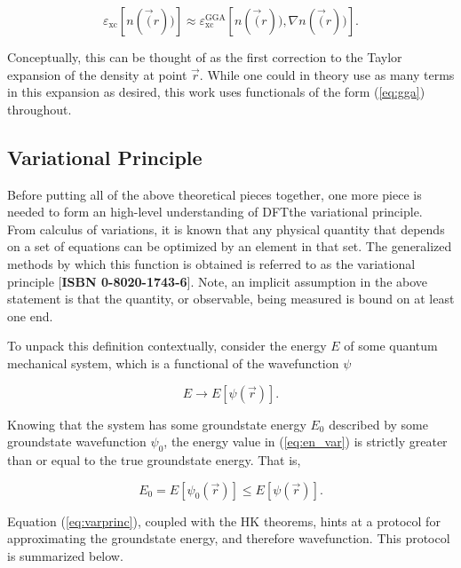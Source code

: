     \begin{equation}
    \label{eq:gga}
        \varepsilon_\text{xc}[n(\vec(r))] \approx \varepsilon_\text{xc}^\text{GGA}[n(\vec(r)),\nabla n(\vec(r))].
    \end{equation}
    
    \noindent Conceptually, this can be thought of as the first correction to the Taylor expansion of the density at point $\vec{r}$. While one could in theory use as many terms in this expansion as desired, this work uses functionals of the form (\ref{eq:gga}) throughout.
    
    \subsection{Variational Principle}
    
    Before putting all of the above theoretical pieces together, one more piece is needed to form an high-level understanding of DFT\textemdash the variational principle. From calculus of variations, it is known that any physical quantity that depends on a set of equations can be optimized by an element in that set. The generalized methods by which this function is obtained is referred to as the variational principle [\textbf{ISBN 0-8020-1743-6}]. Note, an implicit assumption in the above statement is that the quantity, or observable, being measured is bound on at least one end.
    
    To unpack this definition contextually, consider the energy $E$ of some quantum mechanical system, which is a functional of the wavefunction $\psi$
    
    \begin{equation}
    \label{eq:en_var}
        E \rightarrow E[\psi(\vec{r})].
    \end{equation}
    
    \noindent Knowing that the system has some groundstate energy $E_0$ described by some groundstate wavefunction $\psi_0$, the energy value in (\ref{eq:en_var}) is strictly greater than or equal to the true groundstate energy. That is,
    
    \begin{equation}
        \label{eq:varprinc}
        E_0 = E[\psi_0(\vec{r})] \le E[\psi(\Vec{r})].
    \end{equation}
    
    Equation (\ref{eq:varprinc}), coupled with the HK theorems, hints at a protocol for approximating the groundstate energy, and therefore wavefunction. This protocol is summarized below.
    
